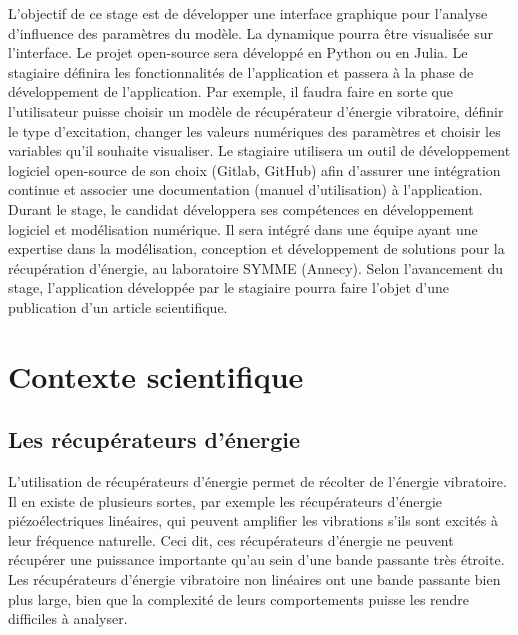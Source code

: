 \documentclass[a4paper, french, 12pt, titlepage]{article}
\begin{document}
L’objectif de ce stage est de développer une interface graphique pour l'analyse d'influence des paramètres du modèle. La dynamique pourra être visualisée sur l’interface. Le projet open-source sera développé en Python ou en Julia. Le stagiaire définira les fonctionnalités de l’application et passera à la phase de développement de l’application. Par exemple, il faudra faire en sorte que l’utilisateur puisse choisir un modèle de récupérateur d’énergie vibratoire, définir le type d’excitation, changer les valeurs numériques des paramètres et choisir les variables qu’il souhaite visualiser. Le stagiaire utilisera un outil de développement logiciel open-source de son choix (Gitlab, GitHub) afin d’assurer une intégration continue et associer une documentation (manuel d’utilisation) à l’application. Durant le stage, le candidat développera ses compétences en développement logiciel et modélisation numérique. Il sera intégré dans une équipe ayant une expertise dans la modélisation, conception et développement de solutions pour la récupération d’énergie, au laboratoire SYMME (Annecy). Selon l’avancement du stage, l’application développée par le stagiaire pourra faire l’objet d’une publication d’un article scientifique.

\newpage

\section{Contexte scientifique}


\subsection{Les récupérateurs d'énergie}

L'utilisation de récupérateurs d'énergie permet de récolter de l'énergie vibratoire. Il en existe de plusieurs sortes, par exemple les récupérateurs d'énergie piézoélectriques linéaires, qui peuvent amplifier les vibrations s'ils sont excités à leur fréquence naturelle. Ceci dit, ces récupérateurs d'énergie ne peuvent récupérer une puissance importante qu'au sein d'une bande passante très étroite. Les récupérateurs d'énergie vibratoire non linéaires ont une bande passante bien plus large, bien que la complexité de leurs comportements puisse les rendre difficiles à analyser. \\
\end{document}
